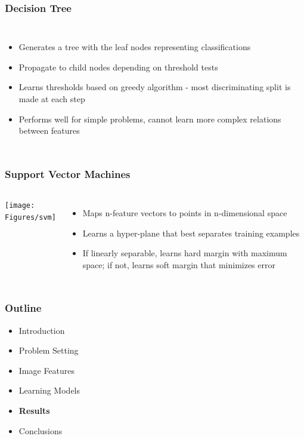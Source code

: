 \documentclass{beamer}
\begin{document}
\begin{frame}
\frametitle{Decision Tree}
\begin{columns}
  \begin{itemize}
    \item Generates a tree with the leaf nodes representing classifications
    \item Propagate to child nodes depending on threshold tests 
    \item Learns thresholds based on greedy algorithm - most discriminating split is made at each step
    \item Performs well for simple problems, cannot learn more complex relations between features
  \end{itemize}
  \scalebox{0.7}{}
  \end{columns}
\end{frame}


\begin{frame}
\frametitle{Support Vector Machines}
\begin{columns}
\texttt{[image: Figures/svm]}
\begin{itemize}
  \item Maps n-feature vectors to points in n-dimensional space
  \item Learns a hyper-plane that best separates training examples
  \item If linearly separable, learns hard margin with maximum space; if not, learns soft margin that minimizes error
\end{itemize}
\end{columns}
\end{frame}


\begin{frame}
\frametitle{Outline}
\begin{itemize}
  \item Introduction
  \item\vspace{0.5cm}Problem Setting
  \item\vspace{0.5cm}Image Features
  \item \vspace{0.5cm}Learning Models
  \item \vspace{0.5cm} \textbf{Results}
  \item \vspace{0.5cm}Conclusions
\end{itemize}
\end{frame}
\end{document}
